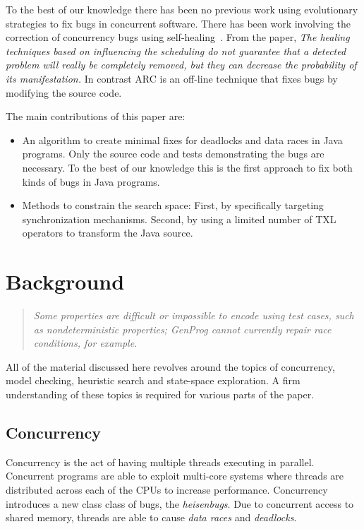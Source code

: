 \documentclass{llncs}
\begin{document}
To the best of our knowledge there has been no previous work using evolutionary
strategies to fix bugs in concurrent software. There has been work involving
the correction of concurrency bugs using self-healing~\cite{LVK08}. From the
paper, \textit{The healing techniques based on influencing the scheduling do
not guarantee that a detected problem will really be completely removed, but
they can decrease the probability of its manifestation.} In contrast ARC is an
off-line technique that fixes bugs by modifying the source code.

The main contributions of this paper are:

\begin{itemize}

\item An algorithm to create minimal fixes for deadlocks and data races in Java
programs. Only the source code and tests demonstrating the bugs are necessary.
To the best of our knowledge this is the first approach to fix both kinds of
bugs in Java programs.

\item Methods to constrain the search space: First, by specifically targeting
synchronization mechanisms. Second, by using a limited number of TXL operators
to transform the Java source.

\end{itemize}

\section{Background}
\label{sec:background}

\begin{quote}
\textit{Some properties are difficult or impossible to encode using test cases,
such as nondeterministic properties; GenProg cannot currently repair race
conditions, for example.}~\cite{GNFW11}
\end{quote}

All of the material discussed here revolves around the topics of concurrency,
model checking, heuristic search and state-space exploration. A firm
understanding of these topics is required for various parts of the paper.

\subsection{Concurrency}
\label{sec:concurrency}

Concurrency is the act of having multiple threads executing in parallel.
Concurrent programs are able to exploit multi-core systems where threads are
distributed across each of the CPUs to increase performance. Concurrency
introduces a new class class of bugs, the \textit{heisenbugs}. Due to
concurrent access to shared memory, threads are able to cause
\textit{data races} and \textit{deadlocks}.
\end{document}
